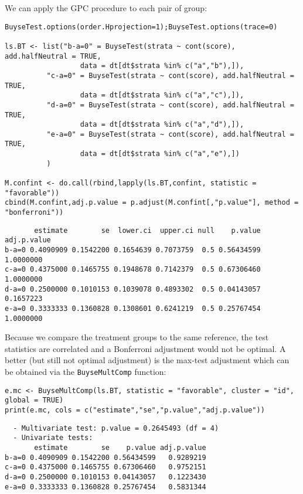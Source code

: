 \documentclass[12pt]{article}
\begin{document}
\clearpage

We can apply the GPC procedure to each pair of group:
\lstset{language=r,label= ,caption= ,captionpos=b,numbers=none}
\begin{lstlisting}
BuyseTest.options(order.Hprojection=1);BuyseTest.options(trace=0)

ls.BT <- list("b-a=0" = BuyseTest(strata ~ cont(score), add.halfNeutral = TRUE,
				  data = dt[dt$strata %in% c("a","b"),]),
	      "c-a=0" = BuyseTest(strata ~ cont(score), add.halfNeutral = TRUE,
				  data = dt[dt$strata %in% c("a","c"),]),
	      "d-a=0" = BuyseTest(strata ~ cont(score), add.halfNeutral = TRUE,
				  data = dt[dt$strata %in% c("a","d"),]),
	      "e-a=0" = BuyseTest(strata ~ cont(score), add.halfNeutral = TRUE,
				  data = dt[dt$strata %in% c("a","e"),])
	      )

M.confint <- do.call(rbind,lapply(ls.BT,confint, statistic = "favorable"))
cbind(M.confint,adj.p.value = p.adjust(M.confint[,"p.value"], method = "bonferroni"))
\end{lstlisting}

\begin{verbatim}
       estimate        se  lower.ci  upper.ci null    p.value adj.p.value
b-a=0 0.4090909 0.1542200 0.1654639 0.7073759  0.5 0.56434599   1.0000000
c-a=0 0.4375000 0.1465755 0.1948678 0.7142379  0.5 0.67306460   1.0000000
d-a=0 0.2500000 0.1010153 0.1039078 0.4893302  0.5 0.04143057   0.1657223
e-a=0 0.3333333 0.1360828 0.1308601 0.6241219  0.5 0.25767454   1.0000000
\end{verbatim}



Because we compare the treatment groups to the same reference, the
test statistics are correlated and a Bonferroni adjustment would not
be optimal. A better (but still not optimal adjustment) is the
max-test adjustment which can be obtained via the \texttt{BuyseMultComp} function:
\lstset{language=r,label= ,caption= ,captionpos=b,numbers=none}
\begin{lstlisting}
e.mc <- BuyseMultComp(ls.BT, statistic = "favorable", cluster = "id", global = TRUE)
print(e.mc, cols = c("estimate","se","p.value","adj.p.value"))
\end{lstlisting}

\begin{verbatim}
  - Multivariate test: p.value = 0.2645493 (df = 4)
  - Univariate tests:
       estimate        se    p.value adj.p.value
b-a=0 0.4090909 0.1542200 0.56434599   0.9289219
c-a=0 0.4375000 0.1465755 0.67306460   0.9752151
d-a=0 0.2500000 0.1010153 0.04143057   0.1223430
e-a=0 0.3333333 0.1360828 0.25767454   0.5831344
\end{verbatim}
\end{document}
